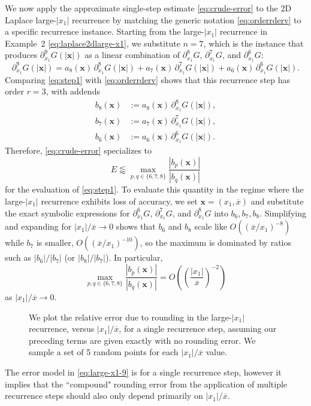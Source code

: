\documentclass[12pt]{article}
\let\b=\boldsymbol
\theoremstyle{definition}
\theoremstyle{plain}
\theoremstyle{definition}
\begin{document}
We now apply the approximate single-step estimate \eqref{eq:crude-error} to the 2D Laplace
large-$|x_1|$ recurrence by matching the generic notation \eqref{eq:orderrderv} to a specific
recurrence instance.  Starting from the large-$|x_1|$ recurrence in Example~2 \eqref{eq:laplace2dlarge-x1},
we substitute $n=7$, which is the instance that produces $\partial_{x_1}^9 G(|\b{x}|)$ as a linear
combination of $\partial_{x_1}^8 G$, $\partial_{x_1}^7 G$, and $\partial_{x_1}^6 G$:
\begin{equation}
\label{eq:step1}
\partial^{9}_{x_1} G(|\b{x}|)
= a_{8}(\b{x})\,\partial^{8}_{x_1} G(|\b{x}|)
+ a_{7}(\b{x})\,\partial^{7}_{x_1} G(|\b{x}|)
+ a_{6}(\b{x})\,\partial^{6}_{x_1} G(|\b{x}|).
\end{equation}
Comparing \eqref{eq:step1} with \eqref{eq:orderrderv} shows that this recurrence step has order $r=3$,
with addends
\begin{align*}
b_{8}(\b{x}) &:= a_{8}(\b{x})\,\partial^{8}_{x_1} G(|\b{x}|),\\
b_{7}(\b{x}) &:= a_{7}(\b{x})\,\partial^{7}_{x_1} G(|\b{x}|),\\
b_{6}(\b{x}) &:= a_{6}(\b{x})\,\partial^{6}_{x_1} G(|\b{x}|).
\end{align*}
Therefore, \eqref{eq:crude-error} specializes to
\[
E \lessapprox \max_{p,q\in\{6,7,8\}} \frac{|b_p(\b{x})|}{|b_q(\b{x})|}
\]
for the evaluation of \eqref{eq:step1}.  To evaluate this quantity in the regime where the
large-$|x_1|$ recurrence exhibits loss of accuracy, we set $\b{x}=(x_1,\overline{x})$ and substitute
the exact symbolic expressions for $\partial_{x_1}^6G$, $\partial_{x_1}^7G$, and $\partial_{x_1}^8G$
into $b_6,b_7,b_8$.  Simplifying and expanding for $|x_1|/\overline{x}\to 0$ shows that $b_6$ and $b_8$
scale like $O((\overline{x}/x_1)^{-8})$ while $b_7$ is smaller, $O((\overline{x}/x_1)^{-10})$, so the
maximum is dominated by ratios such as $|b_6|/|b_7|$ (or $|b_8|/|b_7|$). In particular,
\begin{equation}
\label{eq:large-x1-9}
\max_{p,q\in\{6,7,8\}} \frac{|b_p(\b{x})|}{|b_q(\b{x})|}
=O\!\left(\left(\frac{|x_1|}{\overline{x}}\right)^{-2}\right)
\end{equation}
as $|x_1|/\overline{x} \to 0$.
\begin{figure}[h]
\centering

\caption{We plot the relative error due to rounding in the large-$|x_1|$ recurrence, versus $|x_1|/\overline{x}$, for a single recurrence step, assuming our preceding terms are given exactly with no rounding error. We sample a set of 5 random points for each $|x_1|/\overline{x}$ value.}
\label{fig:llf}
\end{figure}
The error model in \eqref{eq:large-x1-9} is for a single recurrence step, however it implies that the ``compound" rounding error from the application of multiple recurrence steps should also only depend primarily on $|x_1|/\overline{x}$.
\end{document}
